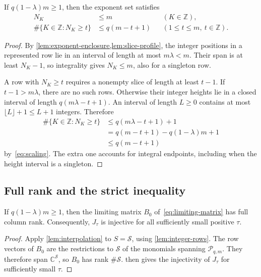 \begin{lemma}\label{lem:integer-rows}
If $q(1-\lambda)m\ge1$, then the exponent set satisfies
\begin{equation}\label{eq:row-count}
 \begin{aligned}
 N_K&\le m &&(K\in\mathbb{Z}),\\
 \#\{K\in\mathbb{Z}:N_K\ge t\}
 &\le q(m-t+1) &&(1\le t\le m,\ t\in\mathbb{Z}).
 \end{aligned}
\end{equation}
\end{lemma}

\begin{proof}
By \cref{lem:exponent-enclosure,lem:slice-profile}, the integer positions in a represented row lie in an interval of length at most $m\lambda<m$. Their span is at least $N_K-1$, so integrality gives $N_K\le m$, also for a singleton row.

A row with $N_K\ge t$ requires a nonempty slice of length at least $t-1$. If $t-1>m\lambda$, there are no such rows. Otherwise their integer heights lie in a closed interval of length $q(m\lambda-t+1)$. An interval of length $L\ge0$ contains at most $\lfloor L\rfloor+1\le L+1$ integers. Therefore
\[
 \begin{aligned}
 \#\{K\in\mathbb{Z}:N_K\ge t\}
 &\le q(m\lambda-t+1)+1\\
 &=q(m-t+1)-q(1-\lambda)m+1\\
 &\le q(m-t+1)
 \end{aligned}
\]
by~\eqref{eq:scaling}. The extra one accounts for integral endpoints, including when the height interval is a singleton.
\end{proof}

\subsection{Full rank and the strict inequality}

\begin{proposition}\label{prop:full-rank}
If $q(1-\lambda)m\ge1$, then the limiting matrix $B_0$ of~\eqref{eq:limiting-matrix} has full column rank. Consequently, $J_\tau$ is injective for all sufficiently small positive $\tau$.
\end{proposition}

\begin{proof}
Apply \cref{lem:interpolation} to $S=\mathcal{S}$, using \cref{lem:integer-rows}. The row vectors of $B_0$ are the restrictions to $\mathcal{S}$ of the monomials spanning $\mathcal{P}_{q,m}$. They therefore span $\mathbb{C}^{\mathcal{S}}$, so $B_0$ has rank $\#\mathcal{S}$.  then gives the injectivity of $J_\tau$ for sufficiently small $\tau$.
\end{proof}

